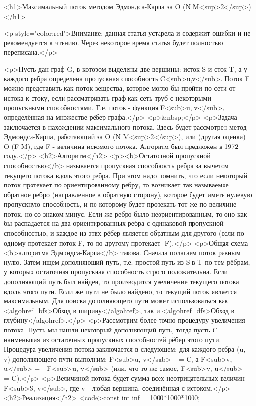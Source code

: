 <h1>Максимальный поток методом Эдмондса-Карпа за O (N M<sup>2</sup>)</h1>

<p style="color:red">Внимание: данная статья устарела и содержит ошибки и не рекомендуется к чтению. Через некоторое время статья будет полностью переписана.</p>

<p>Пусть дан граф G, в котором выделены две вершины: исток S и сток T, а у каждого ребра определена пропускная способность C<sub>u,v</sub>. Поток F можно представить как поток вещества, которое могло бы пройти по сети от истока к стоку, если рассматривать граф как сеть труб с некоторыми пропускными способностями. Т.е. поток - функция F<sub>u, v</sub>, определённая на множестве рёбер графа.</p>
<p>&nbsp;</p>
<p>Задача заключается в нахождении максимального потока. Здесь будет рассмотрен метод Эдмондса-Карпа, работающий за O (N M<sup>2</sup>), или (другая оценка) O (F M), где F - величина искомого потока. Алгоритм был предложен в 1972 году.</p>
<h2>Алгоритм</h2>
<p><b>Остаточной пропускной способностью</b> называется пропускная способность ребра за вычетом текущего потока вдоль этого ребра. При этом надо помнить, что если некоторый поток протекает по ориентированному ребру, то возникает так называемое обратное ребро (направленное в обратную сторону), которое будет иметь нулевую пропускную способность, и по которому будет протекать тот же по величине поток, но со знаком минус. Если же ребро было неориентированным, то оно как бы распадается на два ориентированных ребра с одинаковой пропускной способностью, и каждое из этих рёбер является обратным для другого (если по одному протекает поток F, то по другому протекает -F).</p>
<p>Общая схема <b>алгоритма Эдмондса-Карпа</b> такова. Сначала полагаем поток равным нулю. Затем ищем дополняющий путь, т.е. простой путь из S в T по тем рёбрам, у которых остаточная пропускная способность строго положительна. Если дополняющий путь был найден, то производится увеличение текущего потока вдоль этого пути. Если же пути не было найдено, то текущий поток является максимальным. Для поиска дополняющего пути может использоваться как <algohref=bfs>Обход в ширину</algohref>, так и <algohref=dfs>Обход в глубину</algohref>.</p>
<p>Рассмотрим более точно процедуру увеличения потока. Пусть мы нашли некоторый дополняющий путь, тогда пусть C - наименьшая из остаточных пропускных способностей рёбер этого пути. Процедура увеличения потока заключается в следующем: для каждого ребра (u, v) дополняющего пути выполним: F<sub>u, v</sub> += C, а F<sub>v, u</sub> = - F<sub>u, v</sub> (или, что то же самое, F<sub>v, u</sub> -= C).</p>
<p>Величиной потока будет сумма всех неотрицательных величин F<sub>S, v</sub>, где v - любая вершина, соединённая с истоком.</p>
<h2>Реализация</h2>
<code>const int inf = 1000*1000*1000;


